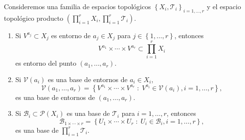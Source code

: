 \begin{prop}
	Consideremos una familia de espacios topológicos $\displaystyle \left\{ X_{i}, \mathcal{T}_{i}\right\} _{i = 1, \ldots, r} $ y el espacio topológico producto $\displaystyle \left(\prod^{r}_{i = 1}X_{i}, \prod^{r}_{i = 1}\mathcal{T}_{i}\right) $. 
	\begin{enumerate}
		\item Si $\displaystyle V^{a_{j}}\subset X_{j} $ es entorno de $\displaystyle a_{j}\in X_{j} $ para $\displaystyle j \in \left\{ 1, \ldots, r\right\}  $, entonces
			\[V^{a_{1}}\times \cdots \times V^{a_{r}}\subset \prod^{r}_{i= 1}X_{i} \]
			es entorno del punto $\displaystyle \left(a_{1}, \ldots, a_{r}\right) $. 
		\item Si $\displaystyle \mathcal{V}\left(a_{i}\right) $ es una base de entornos de $\displaystyle a_{i}\in X_{i} $,
			\[\mathcal{V}\left(a_{1}, \ldots, a_{r}\right)= \left\{ V^{a_{1}} \times \cdots \times V^{a_{r}} \; : \; V^{a_{i}}\in \mathcal{V}\left(a_{i}\right), i = 1, \ldots, r\right\}  ,\]
			es una base de entornos de $\displaystyle \left(a_{1}, \ldots, a_{r}\right) $. 
		\item Si $\displaystyle \mathcal{B}_{i}\subset \mathcal{P}\left(X_{i}\right) $ es una base de $\displaystyle \mathcal{T}_{i} $ para $\displaystyle i = 1, \ldots, r $, entonces
			\[\mathcal{B}_{1 \times \cdots \times r} = \left\{ U_{1} \times \cdots \times U_{r} \; : \; U_{i} \in \mathcal{B}_{i}, i = 1, \ldots, r\right\}  ,\]
			es una base de $\displaystyle \prod^{r}_{i = 1}\mathcal{T}_{i} $.
	\end{enumerate}
\end{prop}

